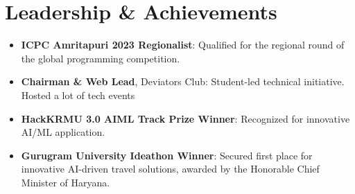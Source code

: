 \documentclass[letterpaper,11pt]{article}
\begin{document}
\section{Leadership \& Achievements}
\begin{itemize}[leftmargin=*,itemsep=2pt,parsep=0pt,topsep=0pt,partopsep=0pt]
	\item \textbf{ICPC Amritapuri 2023 Regionalist}: Qualified for the regional round of the global programming competition.
	\item \textbf{Chairman \& Web Lead}, Deviators Club: Student-led technical initiative. Hosted a lot of tech events
	\item \textbf{HackKRMU 3.0 AIML Track Prize Winner}: Recognized for innovative AI/ML application.
	\item \textbf{Gurugram University Ideathon Winner}: Secured first place for innovative AI-driven travel solutions, awarded by the Honorable Chief Minister of Haryana.
\end{itemize}
\end{document}
